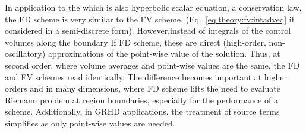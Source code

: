 In application to the which is also hyperbolic scalar equation, a conservation law, the \ac{FD} scheme is very similar to the \ac{FV} scheme, 
(Eq.~\eqref{eq:theory:fv:intadveq} if considered in a 
semi-discrete form).
However,instead of integrals of the control volumes along the boundary
If \ac{FD} scheme, these are direct (high-order, non-oscillatory) approximations 
of the point-wise value of the solution.
Thus, at second order, where  volume averages and point-wise values are the same,
the \ac{FD} and \ac{FV} schemes read identically.
The difference becomes important at higher orders and in many dimensions, 
where \ac{FD} scheme lifts the need to evaluate Riemann problem at region boundaries,
especially for the performance of a scheme.
Additionally, in \ac{GRHD} applications, the treatment of source terms simplifies as 
only point-wise values are needed.

%


